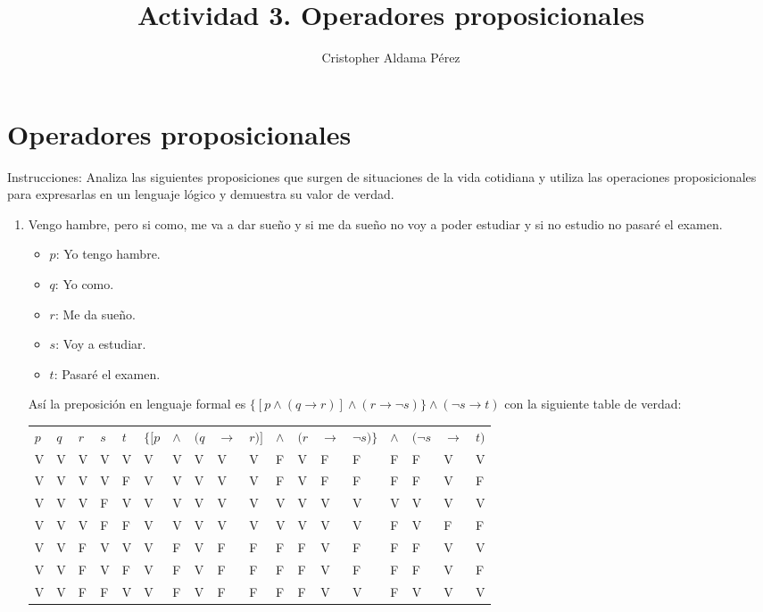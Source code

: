 \documentclass[a4paper,10pt]{article}
\title{Actividad 3. Operadores proposicionales}
\author{Cristopher Aldama Pérez}
\begin{document}
\maketitle

\section{Operadores proposicionales}

Instrucciones: Analiza las siguientes proposiciones que surgen de situaciones de la vida cotidiana y utiliza las operaciones proposicionales para expresarlas en un lenguaje lógico y demuestra su valor de verdad. 

\begin{enumerate}
 \item Vengo hambre, pero si como, me va a dar sueño y si me da sueño no voy a poder estudiar y si no estudio no pasaré el examen.
\begin{itemize}
 \item \(p\): Yo tengo hambre.
 \item \(q\): Yo como.
 \item \(r\): Me da sueño.
 \item \(s\): Voy a estudiar.
 \item \(t\): Pasaré el examen.
\end{itemize}
Así la preposición en lenguaje formal es \( \{ [p \land (q \to r )] \land (r \to \neg s) \} \land (\neg s \to t) \) con la siguiente table de verdad:
\begin{center}
\begin{tabular}{llllllllllllllllll}
\(p\) & \(q\) & \(r\) & \(s\) & \(t\) & \(\{[p\) & \(\land\) & \((q\) & \(\to\) & \(r)]\) & \(\land\) & \((r\) & \(\to\) & \(\neg s)\}\) & \(\land\) & \((\neg s\) & \(\to\) & \(t)\) \\
V & V & V & V & V & V & V & V & V & V & F & V & F & F & F & F & V & V\\ 
V & V & V & V & F & V & V & V & V & V & F & V & F & F & F & F & V & F\\
V & V & V & F & V & V & V & V & V & V & V & V & V & V & V & V & V & V\\
V & V & V & F & F & V & V & V & V & V & V & V & V & V & F & V & F & F\\
V & V & F & V & V & V & F & V & F & F & F & F & V & F & F & F & V & V\\
V & V & F & V & F & V & F & V & F & F & F & F & V & F & F & F & V & F\\
V & V & F & F & V & V & F & V & F & F & F & F & V & V & F & V & V & V\\

\end{tabular}
\end{center}
\end{enumerate}
\end{document}
